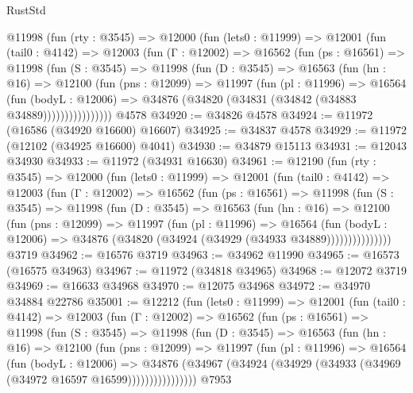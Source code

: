 \begin{lexlean}{RustStd}
\begin{coremodule}
    @11998
      (fun (rty : @3545) =>
      @12000
        (fun (lets0 : @11999) =>
        @12001
          (fun (tail0 : @4142) =>
          @12003
            (fun (Γ : @12002) =>
            @16562
              (fun (ps : @16561) =>
              @11998
                (fun (S : @3545) =>
                @11998
                  (fun (D : @3545) =>
                  @16563
                    (fun (hn : @16) =>
                    @12100
                      (fun (pns : @12099) =>
                      @11997
                        (fun (pl : @11996) =>
                        @16564
                          (fun (bodyL : @12006) =>
                          @34876 (@34820 (@34831 (@34842 (@34883 @34889))))))))))))))))
    @4578
@34920 := @34826 @4578
@34924 := @11972 (@16586 (@34920 @16600) @16607)
@34925 := @34837 @4578
@34929 := @11972 (@12102 (@34925 @16600) @4041)
@34930 := @34879 @15113
@34931 := @12043 @34930
@34933 := @11972 (@34931 @16630)
@34961 := @12190
    (fun (rty : @3545) =>
    @12000
      (fun (lets0 : @11999) =>
      @12001
        (fun (tail0 : @4142) =>
        @12003
          (fun (Γ : @12002) =>
          @16562
            (fun (ps : @16561) =>
            @11998
              (fun (S : @3545) =>
              @11998
                (fun (D : @3545) =>
                @16563
                  (fun (hn : @16) =>
                  @12100
                    (fun (pns : @12099) =>
                    @11997
                      (fun (pl : @11996) =>
                      @16564
                        (fun (bodyL : @12006) =>
                        @34876 (@34820 (@34924 (@34929 (@34933 @34889)))))))))))))))
    @3719
@34962 := @16576 @3719
@34963 := @34962 @11990
@34965 := @16573 (@16575 @34963)
@34967 := @11972 (@34818 @34965)
@34968 := @12072 @3719
@34969 := @16633 @34968
@34970 := @12075 @34968
@34972 := @34970 @34884 @22786
@35001 := @12212
    (fun (lets0 : @11999) =>
    @12001
      (fun (tail0 : @4142) =>
      @12003
        (fun (Γ : @12002) =>
        @16562
          (fun (ps : @16561) =>
          @11998
            (fun (S : @3545) =>
            @11998
              (fun (D : @3545) =>
              @16563
                (fun (hn : @16) =>
                @12100
                  (fun (pns : @12099) =>
                  @11997
                    (fun (pl : @11996) =>
                    @16564
                      (fun (bodyL : @12006) =>
                      @34876
                        (@34967
                          (@34924 (@34929 (@34933 (@34969 (@34972 @16597 @16599))))))))))))))))
    @7953

\end{coremodule}
\end{lexlean}
